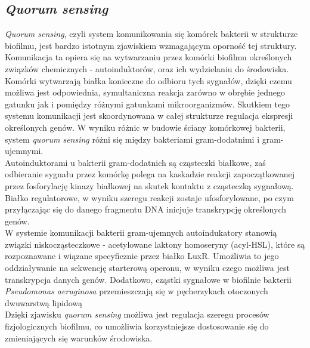 \documentclass[11pt,a4paper]{report}
\begin{document}
\subsection*{\textit{Quorum sensing}}
\textit{Quorum sensing}, czyli system komunikowania się komórek bakterii w strukturze biofilmu, jest bardzo istotnym zjawiskiem wzmagającym oporność tej struktury.
Komunikacja ta opiera się na wytwarzaniu przez komórki biofilmu określonych związków chemicznych - autoinduktorów, oraz ich wydzielaniu do środowiska. Komórki wytwarzają białka konieczne do odbioru tych sygnałów, dzięki czemu możliwa jest odpowiednia, symultaniczna reakcja zarówno w obrębie jednego gatunku jak i pomiędzy różnymi gatunkami mikroorganizmów\cite{leginowicz}. 
Skutkiem tego systemu komunikacji jest skoordynowana w całej strukturze regulacja ekspresji określonych genów\cite{kolodynski}.
W wyniku różnic w budowie ściany komórkowej bakterii, system \textit{quorum sensing} różni się między bakteriami gram-dodatnimi i gram-ujemnymi.\\
Autoinduktorami u bakterii gram-dodatnich są cząsteczki białkowe, zaś odbieranie sygnału przez komórkę polega na kaskadzie reakcji zapoczątkowanej przez fosforylację kinazy białkowej na skutek kontaktu z cząsteczką sygnałową. Białko regulatorowe, w wyniku szeregu reakcji zostaje ufosforylowane, po czym przyłączając się do danego fragmentu DNA inicjuje transkrypcję określonych genów.\\
W systemie komunikacji bakterii gram-ujemnych autoindukatory stanowią związki niskocząsteczkowe - acetylowane laktony homoseryny (acyl-HSL), które są rozpoznawane i wiązane specyficznie przez białko LuxR. Umożliwia to jego oddziaływanie na sekwencję starterową operonu, w wyniku czego możliwa jest transkrypcja danych genów\cite{czaczyk-myszka, zajac}.
Dodatkowo, cząstki sygnałowe w biofilnie bakterii \textit{Pseudomonas aeruginosa} przemieszczają się w pęcherzykach otoczonych dwuwarstwą lipidową\cite{membrane, smith}\\
Dzięki zjawisku \textit{quorum sensing} możliwa jest regulacja szeregu procesów fizjologicznych biofilmu, co umożliwia korzystniejsze dostosowanie się do zmieniających się warunków środowiska\cite{czaczyk-myszka, leginowicz}.



\end{document}
